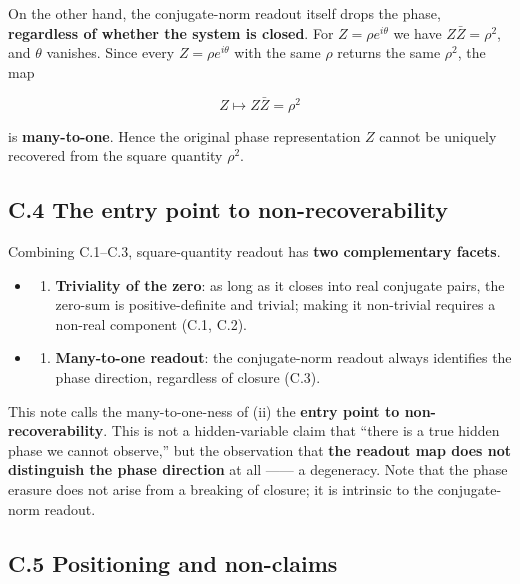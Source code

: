 \documentclass[11pt,a4paper]{article}
\providecommand{\tightlist}{\setlength{\itemsep}{0pt}\setlength{\parskip}{0pt}}
\begin{document}
On the other hand, the conjugate-norm readout itself drops the phase,
\textbf{regardless of whether the system is closed}. For
\(Z=\rho e^{i\theta}\) we have \(Z\bar Z=\rho^2\), and \(\theta\)
vanishes. Since every \(Z=\rho e^{i\theta}\) with the same \(\rho\)
returns the same \(\rho^2\), the map

\[
Z\longmapsto Z\bar Z=\rho^2
\]

is \textbf{many-to-one}. Hence the original phase representation \(Z\)
cannot be uniquely recovered from the square quantity \(\rho^2\).

\subsection{C.4 The entry point to
non-recoverability}\label{c.4-the-entry-point-to-non-recoverability}

Combining C.1--C.3, square-quantity readout has \textbf{two
complementary facets}.

\begin{itemize}
\tightlist
\item
  \begin{enumerate}
  \def\labelenumi{(\roman{enumi})}
  \tightlist
  \item
    \textbf{Triviality of the zero}: as long as it closes into real
    conjugate pairs, the zero-sum is positive-definite and trivial;
    making it non-trivial requires a non-real component (C.1, C.2).
  \end{enumerate}
\item
  \begin{enumerate}
  \def\labelenumi{(\roman{enumi})}
  \setcounter{enumi}{1}
  \tightlist
  \item
    \textbf{Many-to-one readout}: the conjugate-norm readout always
    identifies the phase direction, regardless of closure (C.3).
  \end{enumerate}
\end{itemize}

This note calls the many-to-one-ness of (ii) the \textbf{entry point to
non-recoverability}. This is not a hidden-variable claim that ``there is
a true hidden phase we cannot observe,'' but the observation that
\textbf{the readout map does not distinguish the phase direction} at all
------ a degeneracy. Note that the phase erasure does not arise from a
breaking of closure; it is intrinsic to the conjugate-norm readout.

\subsection{C.5 Positioning and
non-claims}\label{c.5-positioning-and-non-claims}
\end{document}
